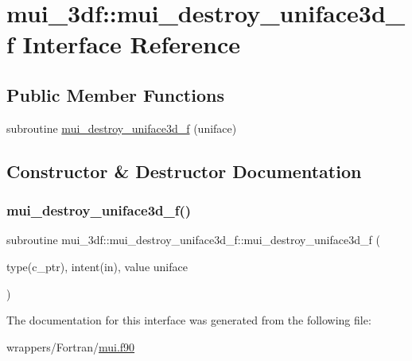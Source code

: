\hypertarget{interfacemui__3df_1_1mui__destroy__uniface3d__f}{}\section{mui\+\_\+3df\+:\+:mui\+\_\+destroy\+\_\+uniface3d\+\_\+f Interface Reference}
\label{interfacemui__3df_1_1mui__destroy__uniface3d__f}
\subsection*{Public Member Functions}
\begin{DoxyCompactItemize}
\item 
subroutine \hyperlink{interfacemui__3df_1_1mui__destroy__uniface3d__f_acf184eb90801b6a68c3e15c2bfd46946}{mui\+\_\+destroy\+\_\+uniface3d\+\_\+f} (uniface)
\end{DoxyCompactItemize}


\subsection{Constructor \& Destructor Documentation}
\mbox{\label{interfacemui__3df_1_1mui__destroy__uniface3d__f_acf184eb90801b6a68c3e15c2bfd46946}} 
\subsubsection{\texorpdfstring{mui\+\_\+destroy\+\_\+uniface3d\+\_\+f()}{mui\_destroy\_uniface3d\_f()}}
{\footnotesize\ttfamily subroutine mui\+\_\+3df\+::mui\+\_\+destroy\+\_\+uniface3d\+\_\+f\+::mui\+\_\+destroy\+\_\+uniface3d\+\_\+f (\begin{DoxyParamCaption}\item[{type(c\+\_\+ptr), intent(in), value}]{uniface }\end{DoxyParamCaption})}



The documentation for this interface was generated from the following file\+:\begin{DoxyCompactItemize}
\item 
wrappers/\+Fortran/\hyperlink{mui_8f90}{mui.\+f90}\end{DoxyCompactItemize}
